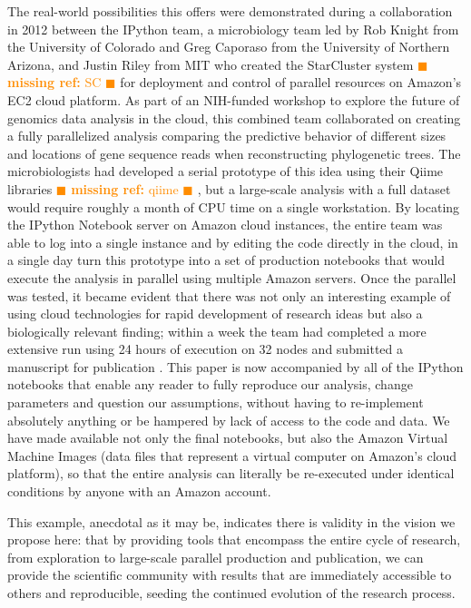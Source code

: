 \documentclass[ChapterTOCs,krantz2]{krantz} %
\theoremstyle{definition}
\newcommand{\mref}[1] { \textcolor{darkorange} {
\ensuremath{\blacksquare} {\bf missing ref:}  {#1}
\ensuremath{\blacksquare} } }
\begin{document}
The real-world possibilities this offers were demonstrated during a
collaboration in 2012 between the IPython team, a microbiology team led by Rob
Knight from the University of Colorado and Greg Caporaso from the University of
Northern Arizona, and Justin Riley from MIT who created the StarCluster system
\mref{SC} for deployment and control of parallel resources on Amazon's EC2
cloud platform.  As part of an NIH-funded workshop to explore the future of
genomics data analysis in the cloud, this combined team collaborated on
creating a fully parallelized analysis comparing the predictive behavior of
different sizes and locations of gene sequence reads when reconstructing
phylogenetic trees.  The microbiologists had developed a serial prototype of
this idea using their Qiime libraries \mref{qiime}, but a large-scale analysis
with a full dataset would require roughly a month of CPU time on a single
workstation.  By locating the IPython Notebook server on Amazon cloud
instances, the entire team was able to log into a single instance and by
editing the code directly in the cloud, in a single day turn this prototype
into a set of production notebooks that would execute the analysis in parallel
using multiple Amazon servers.  Once the parallel was tested, it became evident
that there was not only an interesting example of using cloud technologies for
rapid development of research ideas but also a biologically relevant finding;
within a week the team had completed a more extensive run using 24 hours of
execution on 32 nodes and submitted a manuscript for publication \cite{RWM+12}.
This paper is now accompanied by all of the IPython notebooks that enable any
reader to fully reproduce our analysis, change parameters and question our
assumptions, without having to re-implement absolutely anything or be hampered
by lack of access to the code and data.  We have made available not only the
final notebooks, but also the Amazon Virtual Machine Images (data files that
represent a virtual computer on Amazon's cloud platform), so that the entire
analysis can literally be re-executed under identical conditions by anyone with
an Amazon account.

This example, anecdotal as it may be, indicates there is validity in the vision
we propose here: that by providing tools that encompass the entire cycle of
research, from exploration to large-scale parallel production and publication,
we can provide the scientific community with results that are immediately
accessible to others and reproducible, seeding the continued evolution of the
research process.
\end{document}
